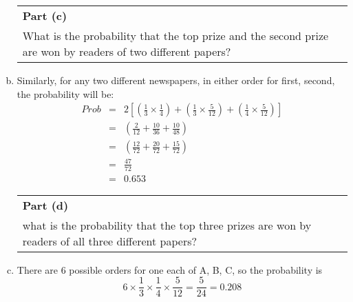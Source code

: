 \documentclass[a4paper,12pt]{article}
\begin{document}
\begin{enumerate}[(a)]

\begin{table}[ht!]
     \centering
     \begin{tabular}{|p{15cm}|}
     \hline        
\noindent \textbf{Part (c)}\\
\noindent
What is the probability that the top prize and the second prize are won by readers
of two different papers?

\\ \hline
 \end{tabular}
\end{table}

\item Similarly, for any two different newspapers, in either order for first, second, the probability
will be: 
\begin{eqnarray*}
Prob &=& 2 \left[\left( \frac{1}{3} \times \frac{1}{4} \right) + \left( \frac{1}{3} \times \frac{5}{12} \right) + \left( \frac{1}{4} \times \frac{5}{12} \right)\right]\\
&=& \left( \frac{2}{12} + \frac{10}{36} + \frac{10}{48} \right) \\
&=& \left( \frac{12}{72} + \frac{20}{72} + \frac{15}{72} \right) \\
&=& \frac{47}{72} \\
&=& 0.653
\end{eqnarray*}



\begin{table}[ht!]
     \centering
     \begin{tabular}{|p{15cm}|}
     \hline        
\noindent \textbf{Part (d)}\\
\noindent what is the probability that the top three prizes are won by readers of all three
different papers?

\\ \hline
 \end{tabular}
\end{table}

\item There are 6 possible orders for one each of A, B, C, so the probability is \[6\times \frac{1}{3} \times \frac{1}{4}\times  \frac{5}{12}
 = \frac{5}{24} = 0.208 \]
\end{enumerate}
\end{document}
